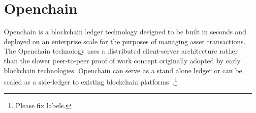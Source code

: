\section{Openchain}

Openchain is a blockchain ledger technology designed to be built in seconds and
deployed on an enterprise scale for the purposes of managing asset
transactions. The Openchain technology uses a distributed client-server
architecture rather than the slower peer-to-peer proof of work concept
originally adopted by early blockchain technologies. Openchain can serve as a
stand alone ledger or can be scaled as a side-ledger to existing blockchain
platforms~\cite{Openchain}.\footnote{Please fix labels.}
